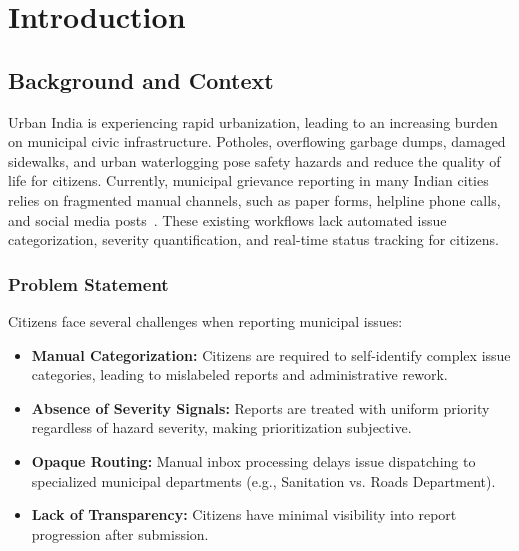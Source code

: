 \documentclass{tietreport}
\author{%
  \texttt{1024030806} Chintan Sood \\
  \texttt{1024030807} Tanu Bansal \\
  \texttt{1024030802} Adhyan Gupta%
}
\begin{document}
\maketitle

\tableofcontents


\chapter{Introduction}

\section{Background and Context}

Urban India is experiencing rapid urbanization, leading to an increasing burden on municipal civic infrastructure. Potholes, overflowing garbage dumps, damaged sidewalks, and urban waterlogging pose safety hazards and reduce the quality of life for citizens. Currently, municipal grievance reporting in many Indian cities relies on fragmented manual channels, such as paper forms, helpline phone calls, and social media posts~\cite{whent2022civic}. These existing workflows lack automated issue categorization, severity quantification, and real-time status tracking for citizens.

\subsection{Problem Statement}

Citizens face several challenges when reporting municipal issues:
\begin{itemize}
  \item \textbf{Manual Categorization:} Citizens are required to self-identify complex issue categories, leading to mislabeled reports and administrative rework.
  \item \textbf{Absence of Severity Signals:} Reports are treated with uniform priority regardless of hazard severity, making prioritization subjective.
  \item \textbf{Opaque Routing:} Manual inbox processing delays issue dispatching to specialized municipal departments (e.g., Sanitation vs. Roads Department).
  \item \textbf{Lack of Transparency:} Citizens have minimal visibility into report progression after submission.
\end{itemize}
\end{document}
